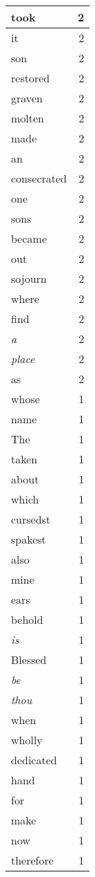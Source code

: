 \begin{center}
\begin{longtable}{l|r}
took & 2\\ \hline 
it & 2\\ \hline 
son & 2\\ \hline 
restored & 2\\ \hline 
graven & 2\\ \hline 
molten & 2\\ \hline 
made & 2\\ \hline 
an & 2\\ \hline 
consecrated & 2\\ \hline 
one & 2\\ \hline 
sons & 2\\ \hline 
became & 2\\ \hline 
out & 2\\ \hline 
sojourn & 2\\ \hline 
where & 2\\ \hline 
find & 2\\ \hline 
\emph{a} & 2\\ \hline 
\emph{place} & 2\\ \hline 
as & 2\\ \hline 
whose & 1\\ \hline 
name & 1\\ \hline 
The & 1\\ \hline 
taken & 1\\ \hline 
about & 1\\ \hline 
which & 1\\ \hline 
cursedst & 1\\ \hline 
spakest & 1\\ \hline 
also & 1\\ \hline 
mine & 1\\ \hline 
ears & 1\\ \hline 
behold & 1\\ \hline 
\emph{is} & 1\\ \hline 
Blessed & 1\\ \hline 
\emph{be} & 1\\ \hline 
\emph{thou} & 1\\ \hline 
when & 1\\ \hline 
wholly & 1\\ \hline 
dedicated & 1\\ \hline 
hand & 1\\ \hline 
for & 1\\ \hline 
make & 1\\ \hline 
now & 1\\ \hline 
therefore & 1\\ \hline 

\end{longtable}
\end{center}

